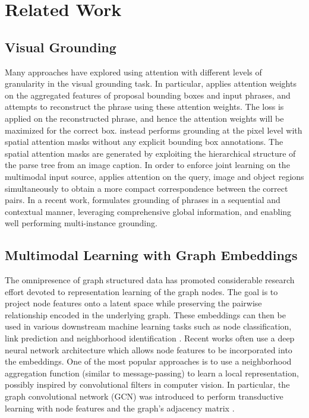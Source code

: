 \section{Related Work}
\subsection{Visual Grounding}
\label{sec: vg_attention}

Many approaches have explored using attention with different levels of granularity in the visual grounding task. In particular, \cite{rohrbach2016grounding} applies attention weights on the aggregated features of proposal bounding boxes and input phrases, and attempts to reconstruct the phrase using these attention weights. The loss is applied on the reconstructed phrase, and hence the attention weights will be maximized for the correct box. \cite{xiao2017weakly} instead performs grounding at the pixel level with spatial attention masks without any explicit bounding box annotations. The spatial attention masks are generated by exploiting the hierarchical structure of the parse tree from an image caption. In order to enforce joint learning on the multimodal input source, \cite{deng2018visual} applies attention on the query, image and object regions simultaneously to obtain a more compact correspondence between the correct pairs. In a recent work, \cite{dogan2019neural} formulates grounding of phrases in a sequential and contextual manner, leveraging comprehensive global information, and enabling well performing multi-instance grounding.

\subsection{Multimodal Learning with Graph Embeddings}
The omnipresence of graph structured data has promoted considerable research effort devoted to representation learning of the graph nodes. The goal is to project node features onto a latent space while preserving the pairwise relationship encoded in the underlying graph. These embeddings can then be used in various downstream machine learning tasks such as node classification, link prediction and neighborhood identification \cite{hamilton2017representation}. Recent works often use a deep neural network architecture which allows node features to be incorporated into the embeddings. One of the most popular approaches is to use a neighborhood aggregation function (similar to message-passing) to learn a local representation, possibly inspired by convolutional filters in computer vision. In particular, the graph convolutional network (GCN) was introduced to perform transductive learning with node features and the graph's adjacency matrix \cite{kipf2016semi}.


